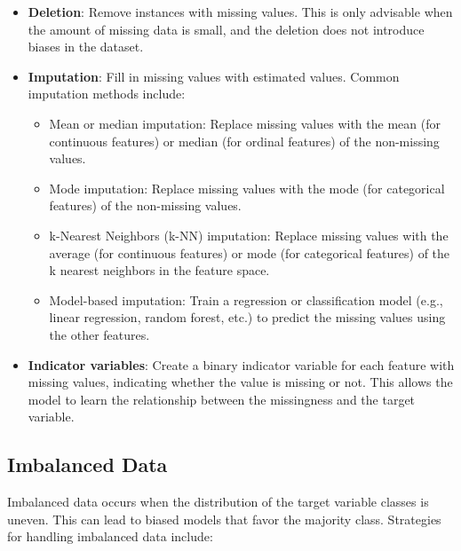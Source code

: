 \documentclass[12pt]{article}
\begin{document}
\begin{itemize}
\item \textbf{Deletion}: Remove instances with missing values. This is only advisable when the amount of missing data is small, and the deletion does not introduce biases in the dataset.
\item \textbf{Imputation}: Fill in missing values with estimated values. Common imputation methods include:
\begin{itemize}
\item Mean or median imputation: Replace missing values with the mean (for continuous features) or median (for ordinal features) of the non-missing values.
\item Mode imputation: Replace missing values with the mode (for categorical features) of the non-missing values.
\item k-Nearest Neighbors (k-NN) imputation: Replace missing values with the average (for continuous features) or mode (for categorical features) of the k nearest neighbors in the feature space.
\item Model-based imputation: Train a regression or classification model (e.g., linear regression, random forest, etc.) to predict the missing values using the other features.
\end{itemize}
\item \textbf{Indicator variables}: Create a binary indicator variable for each feature with missing values, indicating whether the value is missing or not. This allows the model to learn the relationship between the missingness and the target variable.
\end{itemize}

\subsection{Imbalanced Data}

Imbalanced data occurs when the distribution of the target variable classes is uneven. This can lead to biased models that favor the majority class. Strategies for handling imbalanced data include:
\end{document}
